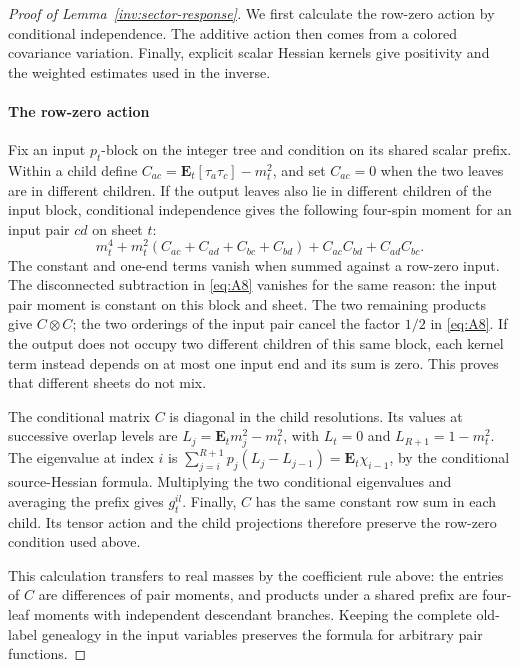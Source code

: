 \begin{proof}[Proof of Lemma~\ref{inv:sector-response}]
We first calculate the row-zero action by conditional independence.
The additive action then comes from a colored covariance variation.
Finally, explicit scalar Hessian kernels give positivity and the
weighted estimates used in the inverse.

\paragraph{The row-zero action}
Fix an input \(p_t\)-block on the integer tree and condition on
its shared scalar prefix. Within a child define
\(C_{ac}=\mathbf E_t[\tau_a\tau_c]-m_t^2\), and set \(C_{ac}=0\)
when the two leaves are in different children. If the output leaves
also lie in different children of the input block, conditional
independence gives the following four-spin moment for an input pair
\(cd\) on sheet \(t\):
\[
 m_t^4+m_t^2(C_{ac}+C_{ad}+C_{bc}+C_{bd})+C_{ac}C_{bd}+C_{ad}C_{bc}.
\]
The constant and one-end terms vanish when summed against a row-zero
input. The disconnected subtraction in \eqref{eq:A8} vanishes for
the same reason: the input pair moment is constant on this block and
sheet. The two remaining products give \(C\otimes C\); the two
orderings of the input pair cancel the factor \(1/2\) in
\eqref{eq:A8}. If the output does not occupy two different children of
this same block, each kernel term instead depends on at most one input
end and its sum is zero. This proves that different sheets do not mix.

The conditional matrix \(C\) is diagonal in the child resolutions. Its
values at successive overlap levels are
\(L_j=\mathbf E_t m_j^2-m_t^2\), with \(L_t=0\) and
\(L_{R+1}=1-m_t^2\). The eigenvalue at index \(i\) is
\(\sum_{j=i}^{R+1}p_j(L_j-L_{j-1})=\mathbf E_t\chi_{i-1}\),
by the conditional source-Hessian formula. Multiplying the two
conditional eigenvalues and averaging the prefix gives \(g_t^{il}\).
Finally, \(C\) has the same constant row sum in each child. Its tensor
action and the child projections therefore preserve the row-zero
condition used above.

This calculation transfers to real masses by the coefficient rule
above: the entries of \(C\) are differences of pair moments, and
products under a shared prefix are four-leaf moments with independent
descendant branches. Keeping the complete old-label genealogy in the
input variables preserves the formula for arbitrary pair functions.


\end{proof}

